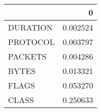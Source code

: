 \begin{tabular}{lr}
\toprule
{} &         0 \\
\midrule
DURATION &  0.002524 \\
PROTOCOL &  0.003797 \\
PACKETS  &  0.004286 \\
BYTES    &  0.013321 \\
FLAGS    &  0.053270 \\
CLASS    &  0.250633 \\
\bottomrule
\end{tabular}
